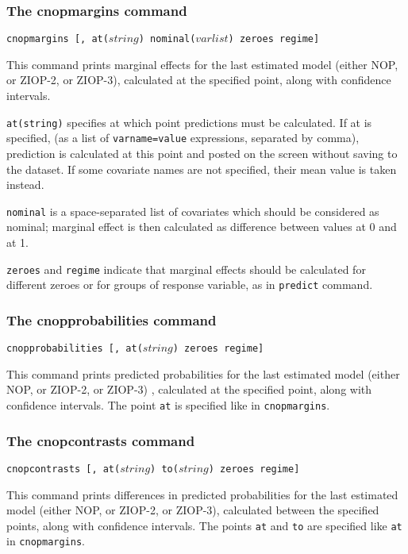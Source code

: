 \documentclass[letterpaper,fleqn,12pt]{article}
\begin{document}
\begin{onehalfspace}
\subsubsection*{The cnopmargins command}

\texttt{cnopmargins [, at($string$) nominal($varlist$) zeroes regime]}

This command prints marginal effects for the last estimated model (either
NOP, or ZIOP-2, or ZIOP-3), calculated at the specified point, along with
confidence intervals.

\texttt{at(string)} specifies at which point predictions must be calculated.
If at is specified, (as a list of \texttt{varname=value} expressions,
separated by comma), prediction is calculated at this point and posted on
the screen without saving to the dataset. If some covariate names are not
specified, their mean value is taken instead.

\texttt{nominal} is a space-separated list of covariates which should be
considered as nominal; marginal effect is then calculated as difference
between values at 0 and at 1.

\texttt{zeroes} and \texttt{regime} indicate that marginal effects should be
calculated for different zeroes or for groups of response variable, as in 
\texttt{predict} command.

\subsubsection*{The cnopprobabilities command}

\texttt{cnopprobabilities [, at($string$) zeroes regime]}

This command prints predicted probabilities for the last estimated model
(either NOP, or ZIOP-2, or ZIOP-3) , calculated at the specified point,
along with confidence intervals. The point \texttt{at} is specified like in 
\texttt{cnopmargins}.

\subsubsection*{The cnopcontrasts command}

\texttt{cnopcontrasts [, at($string$) to($string$) zeroes regime] }

This command prints differences in predicted probabilities for the last
estimated model (either NOP, or ZIOP-2, or ZIOP-3), calculated between the
specified points, along with confidence intervals. The points \texttt{at}
and \texttt{to} are specified like \texttt{at} in \texttt{cnopmargins}.


\end{onehalfspace}
\end{document}
